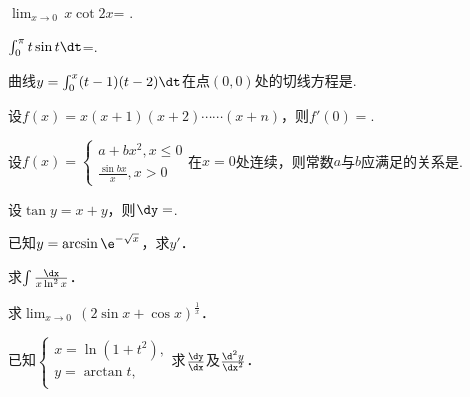 \documentclass[plain,noanswer,medmath]{../../template/jnuexam}
\begin{document}






\begin{problem}
$\lim_{x\to 0}\,x\cot 2x$= \fillin{}.
\end{problem}


\begin{problem}
$\int_0^{\pi}t\sin t\dt$=\fillin{}.
\end{problem}


\begin{problem}
曲线$y=\int_0^x (t-1)(t-2)\dt$在点$(0,0)$处的切线方程是\fillin{}.
\end{problem}


\begin{problem}
设$f(x)=x(x+1)(x+2)\cdots \cdots(x+n)$，则$f'(0)=$\fillin{}.
\end{problem}




\begin{problem}
设$f(x)=\begin{cases}
  a+bx^2,x\le 0 \\
  \frac{\sin bx}{x},x>0
\end{cases}$在$x=0$处连续，则常数$a$与$b$应满足的关系是\fillin{}.
\end{problem}


\begin{problem}
设$\tan y=x+y$，则$\dy=$\fillin{}.
\end{problem}




\begin{problem}
已知$y=\arcsin\e^{-\sqrt{x}}$，求$y'$．
\end{problem}


\begin{problem}
求$\int \frac{\dx}{x\ln^2 x}$．
\end{problem}


\begin{problem}
求$\lim_{x\to 0}\,(2\sin x+\cos x)^{\frac{1}{x}}$．
\end{problem}


\begin{problem}
已知$\begin{cases}
  x=\ln(1+t^2), \\
  y=\arctan t, \\
\end{cases}$求$\frac{\dy}{\dx}$及$\frac{\d^2y}{\dx^2}$．
\end{problem}
\end{document}
